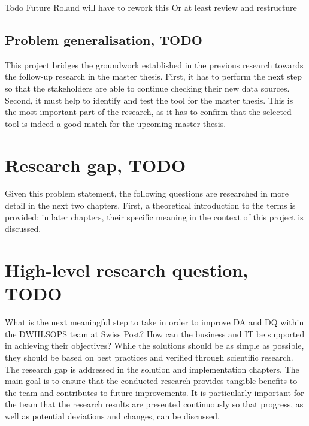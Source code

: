 Todo
Future Roland will have to rework this
Or at least review and restructure







\subsection*{Problem generalisation, TODO}

This project bridges the groundwork established in the previous research towards the follow-up research in the master thesis. First, it has to perform the next step so that the stakeholders are able to continue checking their new data sources. Second, it must help to identify and test the tool for the master thesis. This is the most important part of the research, as it has to confirm that the selected tool is indeed a good match for the upcoming master thesis.



\section{Research gap, TODO}
\label{ResearchResearchGap}

Given this problem statement, the following questions are researched in more detail in the next two chapters. First, a theoretical introduction to the terms is provided; in later chapters, their specific meaning in the context of this project is discussed.



\section{High-level research question, TODO}
\label{ResearchResearchQuestion}

What is the next meaningful step to take in order to improve \gls{DA} and \gls{DQ} within the \gls{DWHLSOPS} team at Swiss Post? How can the business and IT be supported in achieving their objectives? While the solutions should be as simple as possible, they should be based on best practices and verified through scientific research. The research gap is addressed in the solution and implementation chapters. The main goal is to ensure that the conducted research provides tangible benefits to the team and contributes to future improvements. It is particularly important for the team that the research results are presented continuously so that progress, as well as potential deviations and changes, can be discussed.



